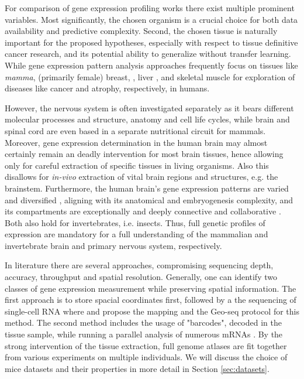 \documentclass[]{article}
\renewcommand{\cite}{\citep}
\begin{document}
For comparison of gene expression profiling works there exist multiple prominent variables. Most significantly, the chosen organism is a crucial choice for both data availability and predictive complexity. Second, the chosen tissue is naturally important for the proposed hypotheses, especially with respect to tissue definitive cancer research, and its potential ability to generalize without transfer learning. While gene expression pattern analysis approaches frequently focus on tissues like \textit{mamma}, (primarily female) breast, \cite{herschkowitz2007identification}, liver \cite{flores2002patterns}, and skeletal muscle \cite{lecker2004multiple} for exploration of diseases like cancer and atrophy, respectively, in humans. 

However, the nervous system is often investigated separately as it bears different molecular processes and structure, anatomy and cell life cycles, while brain and spinal cord are even based in a separate nutritional circuit for mammals. Moreover, gene expression determination in the human brain may almost certainly remain an deadly intervention for most brain tissues, hence allowing only for careful extraction of specific tissues in living organisms. Also this disallows for \textit{in-vivo} extraction of vital brain regions and structures, e.g. the brainstem. Furthermore, the human brain's gene expression patterns are varied and diversified \cite{ramasamy2014genetic}, aligning with its anatomical and embryogenesis complexity, and its compartments are exceptionally and deeply connective and collaborative \cite{fornito2015connectomics}. Both also hold for invertebrates, i.e. insects. Thus, full genetic profiles of expression are mandatory for a full understanding of the mammalian and invertebrate brain and primary nervous system, respectively. 

In literature there are several approaches, compromising sequencing depth, accuracy, throughput and spatial resolution. Generally, one can identify two classes of gene expression measurement while preserving spatial information. The first approach is to store spacial coordinates first, followed by a the sequencing of single-cell RNA where \citet{achim2015high} and \citet{chen2017spatial} propose the mapping and the Geo-seq protocol for this method. The second method includes the usage of "barcodes", decoded in the tissue sample, while running a parallel analysis of numerous mRNAs \cite{ke2013situ, moffitt2016high}. By the strong intervention of the tissue extraction, full genome atlases are fit together from various experiments on multiple individuals. We will discuss the choice of mice datasets and their properties in more detail in Section \ref{sec:datasets}. 
\end{document}
